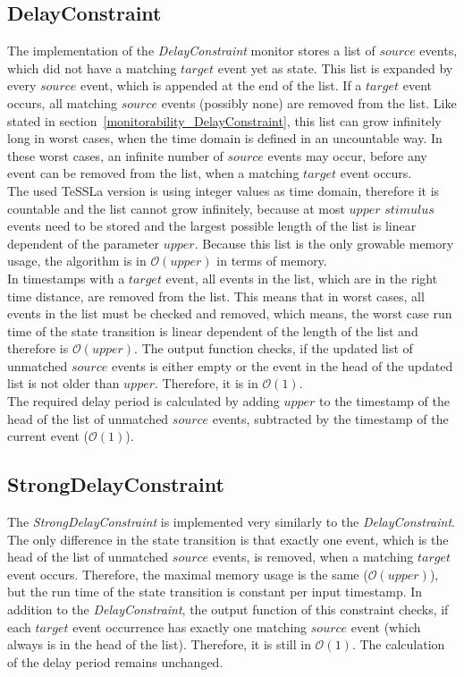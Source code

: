 \subsection{DelayConstraint}
	The implementation of the \emph{DelayConstraint} monitor stores a list of $source$ events, which did not have a matching $target$ event yet as state. This list is expanded by every $source$ event, which is appended at the end of the list. If a $target$ event occurs, all matching $source$ events (possibly none) are removed from the list. Like stated in section~\ref{monitorability_DelayConstraint}, this list can grow infinitely long in worst cases, when the time domain is defined in an uncountable way. In these worst cases, an infinite number of $source$ events may occur, before any event can be removed from the list, when a matching $target$ event occurs.\\
	The used TeSSLa version is using integer values as time domain, therefore it is countable and the list cannot grow infinitely, because at most $upper$ $stimulus$ events need to be stored and the largest possible length of the list is linear dependent of the parameter $upper$. Because this list is the only growable memory usage, the algorithm is in $\mathcal{O}(upper)$ in terms of memory.\\
	In timestamps with a $target$ event, all events in the list, which are in the right time distance, are removed from the list. This means that in worst cases, all events in the list must be checked and removed, which means, the worst case run time of the state transition is linear dependent of the length of the list and therefore is $\mathcal{O}(upper)$. %
	The output function checks, if the updated list of unmatched $source$ events is either empty or the event in the head of the updated list is not older than $upper$. Therefore, it is in $\mathcal{O}(1)$.\\
	The required delay period is calculated by adding $upper$ to the timestamp of the head of the list of unmatched $source$ events, subtracted by the timestamp of the current event ($\mathcal{O}(1)$).
	
\subsection{StrongDelayConstraint}
	The \emph{StrongDelayConstraint} is implemented very similarly to the \emph{DelayConstraint}. The only difference in the state transition is that exactly one event, which is the head of the list of unmatched $source$ events, is removed, when a matching $target$ event occurs. Therefore, the maximal memory usage is the same ($\mathcal{O}(upper)$), but the run time of the state transition is constant per input timestamp.
	In addition to the \textit{DelayConstraint}, the output function of this constraint checks, if each $target$ event occurrence has exactly one matching $source$ event (which always is in the head of the list). Therefore, it is still in $\mathcal{O}(1)$. The calculation of the delay period remains unchanged.
	
